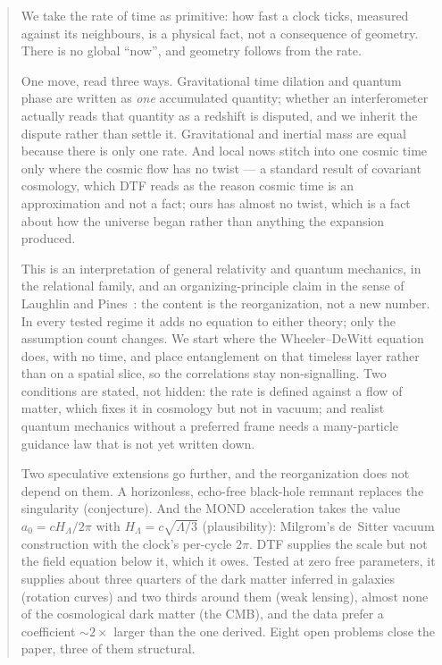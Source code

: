 \documentclass[11pt]{article}
\begin{document}
\begin{abstract}\noindent
We take the rate of time as primitive: how fast a clock ticks, measured against its neighbours, is a physical
fact, not a consequence of geometry. There is no global ``now'', and geometry follows from the rate.

One move, read three ways. Gravitational time dilation and quantum phase are written as \emph{one}
accumulated quantity; whether an interferometer actually reads that quantity as a redshift is disputed, and we
inherit the dispute rather than settle it. Gravitational and inertial mass are equal because there is only one
rate. And local nows stitch into one cosmic time only where the cosmic flow has no twist --- a standard result of
covariant cosmology, which DTF reads as the reason cosmic time is an approximation and not a fact; ours has almost
no twist, which is a fact about how the universe began rather than anything the expansion produced.

This is an interpretation of general relativity and quantum mechanics, in the relational family, and an
organizing-principle claim in the sense of Laughlin and Pines~\cite{LaughlinPines2000}: the content is the
reorganization, not a new number. In every tested regime it adds no equation to either theory; only the
assumption count changes. We start where the Wheeler--DeWitt equation does, with no time, and place
entanglement on that timeless layer rather than on a spatial slice, so the correlations stay non-signalling.
Two conditions are stated, not hidden: the rate is defined against a flow of matter, which fixes it in
cosmology but not in vacuum; and realist quantum mechanics without a preferred frame needs a many-particle
guidance law that is not yet written down.

Two speculative extensions go further, and the reorganization does not depend on them. A horizonless,
echo-free black-hole remnant replaces the singularity (conjecture). And the MOND acceleration takes the value
$a_0=cH_\Lambda/2\pi$ with $H_\Lambda=c\sqrt{\Lambda/3}$ (plausibility): Milgrom's de~Sitter vacuum construction with the
clock's per-cycle $2\pi$. DTF supplies the scale but not the field equation below it, which it owes. Tested at
zero free parameters, it supplies about three quarters of the dark matter inferred in galaxies (rotation curves)
and two thirds around them (weak lensing), almost none of the cosmological dark matter (the CMB), and the data
prefer a coefficient $\sim\!2\times$ larger than the one derived. Eight open problems close the paper, three of them structural.
\end{abstract}
\end{document}

